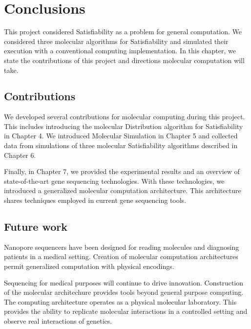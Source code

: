 \chapter{Conclusions}

This project considered {\sc Satisfiability} as a problem for general computation.  We considered three molecular algorithms for {\sc Satisfiability} and simulated their execution with a conventional computing implementation.  In this chapter, we state the contributions of this project and directions molecular computation will take.
	
	\section{Contributions}

We developed several contributions for molecular computing during this project.  This includes introducing the molecular Distribution algorithm for {\sc Satisfiability} in Chapter 4.  We introduced Molecular Simulation in Chapter 5 and collected data from simulations of three molecular {\sc Satisfiability} algorithms described in Chapter 6.  

Finally, in Chapter 7, we provided the experimental results and an overview of state-of-the-art gene sequencing technologies.  With these technologies, we introduced a generalized molecular computation architecture.  This architecture shares techniques employed in current gene sequencing tools.

	\section{Future work}
	
Nanopore sequencers have been designed for reading molecules and diagnosing patients in a medical setting.  Creation of molecular computation architectures permit generalized computation with physical encodings.  

Sequencing for medical purposes will continue to drive innovation. Construction of the molecular architechure provides tools beyond general purpose computing. The computing architecture operates as a physical molecular laboratory.  This provides the ability to replicate molecular interactions in a controlled setting and observe real interactions of genetics.
		

